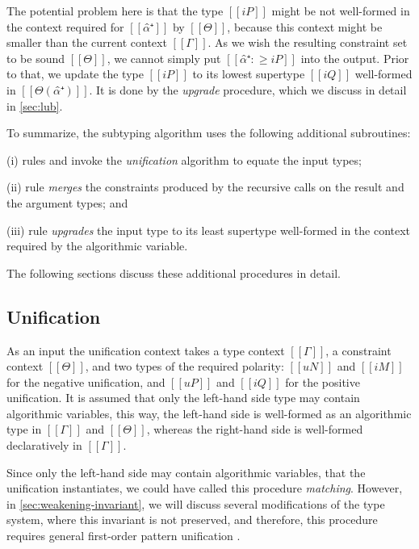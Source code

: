 The potential problem here is that the type $[[iP]]$
might be not well-formed in the context required for $[[α̂⁺]]$ by $[[Θ]]$, 
because this context might be smaller than the current context $[[Γ]]$.
As we wish the resulting constraint set to be sound \wrt $[[Θ]]$,
we cannot simply put $[[α̂⁺ :≥ iP]]$ into the output. 
Prior to that, we update the type $[[iP]]$ to its lowest supertype $[[iQ]]$
well-formed in $[[Θ(α̂⁺)]]$. It is done by the \emph{upgrade} procedure,
which we discuss in detail in \cref{sec:lub}.

\vspace{\baselineskip}
To summarize, the subtyping algorithm uses the following additional subroutines:
\begin{enumerate*}[noitemsep]
  \item[(i)] rules  and
     invoke the \emph{unification} algorithm
    to equate the input types;
  \item[(ii)] rule  \emph{merges} the constraints
    produced by the recursive calls on the result and the argument types; and
  \item[(iii)] rule  \emph{upgrades} the input type
    to its least supertype well-formed in the context required by the
    algorithmic variable.
\end{enumerate*}
The following sections discuss these additional procedures in detail.

\subsection{Unification}
\label{sec:unification}

As an input the unification context 
takes a type context $[[Γ]]$, a constraint context $[[Θ]]$,
and two types of the required polarity:
$[[uN]]$ and  $[[iM]]$ for the negative unification, and
$[[uP]]$ and  $[[iQ]]$ for the positive unification.
It is assumed that only the left-hand side type may contain algorithmic variables,
this way, the left-hand side is well-formed as an algorithmic type in $[[Γ]]$ and 
$[[Θ]]$, whereas the right-hand side is well-formed declaratively in $[[Γ]]$.

Since only the left-hand side may contain algorithmic variables,
that the unification instantiates, we could have called this procedure \emph{matching}.
However, in \cref{sec:weakening-invariant}, we will discuss several modifications of the 
type system, where this invariant is not preserved, and therefore, this procedure
requires general first-order pattern unification \cite{miller1991:unification}.

